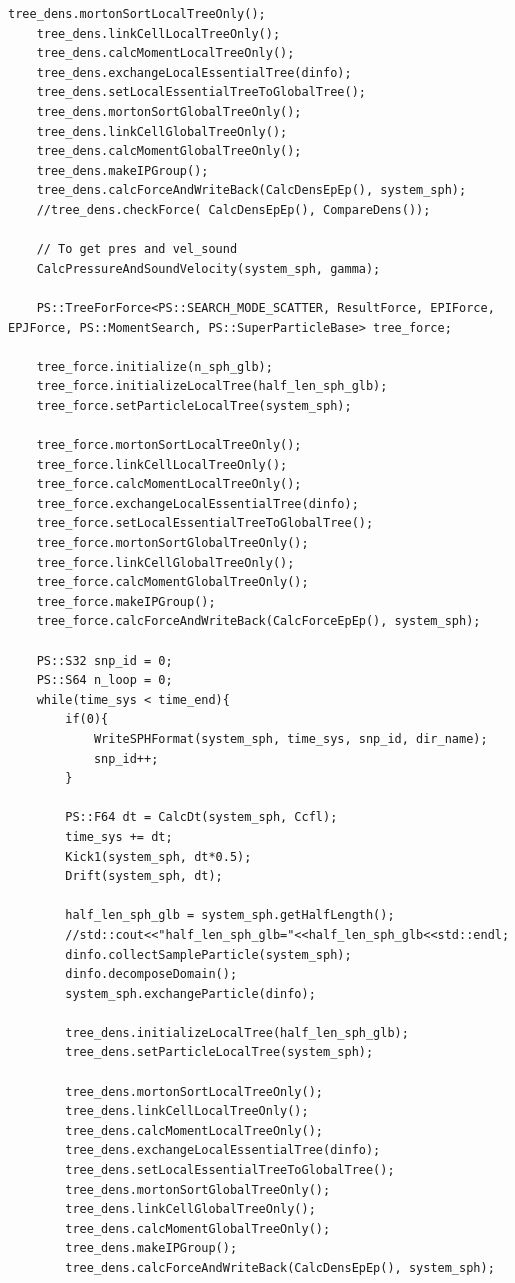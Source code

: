 \begin{lstlisting}[caption=SPHサンプル使用]
    tree_dens.mortonSortLocalTreeOnly();
    tree_dens.linkCellLocalTreeOnly();
    tree_dens.calcMomentLocalTreeOnly();
    tree_dens.exchangeLocalEssentialTree(dinfo);
    tree_dens.setLocalEssentialTreeToGlobalTree();
    tree_dens.mortonSortGlobalTreeOnly();
    tree_dens.linkCellGlobalTreeOnly();
    tree_dens.calcMomentGlobalTreeOnly();
    tree_dens.makeIPGroup();
    tree_dens.calcForceAndWriteBack(CalcDensEpEp(), system_sph);
    //tree_dens.checkForce( CalcDensEpEp(), CompareDens());

    // To get pres and vel_sound
    CalcPressureAndSoundVelocity(system_sph, gamma);

    PS::TreeForForce<PS::SEARCH_MODE_SCATTER, ResultForce, EPIForce, EPJForce, PS::MomentSearch, PS::SuperParticleBase> tree_force;

    tree_force.initialize(n_sph_glb);
    tree_force.initializeLocalTree(half_len_sph_glb);
    tree_force.setParticleLocalTree(system_sph);

    tree_force.mortonSortLocalTreeOnly();
    tree_force.linkCellLocalTreeOnly();
    tree_force.calcMomentLocalTreeOnly();
    tree_force.exchangeLocalEssentialTree(dinfo);
    tree_force.setLocalEssentialTreeToGlobalTree();
    tree_force.mortonSortGlobalTreeOnly();
    tree_force.linkCellGlobalTreeOnly();
    tree_force.calcMomentGlobalTreeOnly();
    tree_force.makeIPGroup();
    tree_force.calcForceAndWriteBack(CalcForceEpEp(), system_sph);

    PS::S32 snp_id = 0;
    PS::S64 n_loop = 0;
    while(time_sys < time_end){
        if(0){
            WriteSPHFormat(system_sph, time_sys, snp_id, dir_name);
            snp_id++;
        }

        PS::F64 dt = CalcDt(system_sph, Ccfl);
        time_sys += dt;
        Kick1(system_sph, dt*0.5);
        Drift(system_sph, dt);

        half_len_sph_glb = system_sph.getHalfLength();
        //std::cout<<"half_len_sph_glb="<<half_len_sph_glb<<std::endl;
        dinfo.collectSampleParticle(system_sph);
        dinfo.decomposeDomain();
        system_sph.exchangeParticle(dinfo);

        tree_dens.initializeLocalTree(half_len_sph_glb);
        tree_dens.setParticleLocalTree(system_sph);

        tree_dens.mortonSortLocalTreeOnly();
        tree_dens.linkCellLocalTreeOnly();
        tree_dens.calcMomentLocalTreeOnly();
        tree_dens.exchangeLocalEssentialTree(dinfo);
        tree_dens.setLocalEssentialTreeToGlobalTree();
        tree_dens.mortonSortGlobalTreeOnly();
        tree_dens.linkCellGlobalTreeOnly();
        tree_dens.calcMomentGlobalTreeOnly();
        tree_dens.makeIPGroup();
        tree_dens.calcForceAndWriteBack(CalcDensEpEp(), system_sph);


\end{lstlisting}
